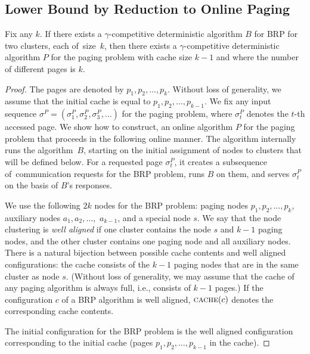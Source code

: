 \documentclass{siamart190516}
\begin{document}
\subsection{Lower Bound by Reduction to Online Paging}
\label{sec:paging}

\begin{theorem}
Fix any $k$. If there exists a $\gamma$-competitive deterministic algorithm $B$
for BRP for two clusters, each of~size~$k$, then there exists a
$\gamma$-competitive deterministic algorithm $P$ for the paging problem with 
cache size $k-1$ and where the number of different pages is $k$.
\end{theorem}

\begin{proof}
The pages are denoted by $p_1,p_2,\ldots,p_k$. Without loss of generality, we
assume that the initial cache is equal to $p_1,p_2,\ldots,p_{k-1}$. We fix any
input sequence $\sigma^P = (\sigma^P_1, \sigma^P_2, \sigma^P_3, \ldots)$ for the
paging problem, where $\sigma^P_t$ denotes the $t$-th accessed page. We show
how to construct, an online algorithm $P$ for the paging
problem that proceeds in the following online manner. 
The algorithm internally runs the algorithm~$B$, 
starting on the initial assignment of nodes to clusters that will be
defined below. For a requested page $\sigma^P_t$, it creates a subsequence
of~communication requests for the BRP problem, runs $B$ on them, and serves
$\sigma^P_t$ on the basis of $B$'s responses.

We use the following $2k$ nodes for the BRP problem: paging nodes $p_1,p_2,
\ldots, p_k$, auxiliary nodes $a_1,a_2,\ldots,$ $a_{k-1}$, and a special node
$s$. We say that the node clustering is \emph{well aligned} if one cluster
contains the node $s$ and $k-1$ paging nodes, and the other cluster contains
one paging node and all auxiliary nodes. There is a natural bijection between
possible cache contents and well aligned configurations: the cache consists of
the $k-1$ paging nodes that are in the same cluster as node $s$. (Without loss
of generality, we may assume that the cache of any paging algorithm is always
full, i.e., consists of $k-1$ pages.) If the configuration $c$ of a BRP
algorithm is well aligned, $\textsc{cache}(c)$ denotes the corresponding cache
contents.

The initial configuration for the BRP problem is the well aligned
configuration corresponding to the initial cache (pages
$p_1,p_2,\ldots,p_{k-1}$ in the cache).


\end{proof}
\end{document}
